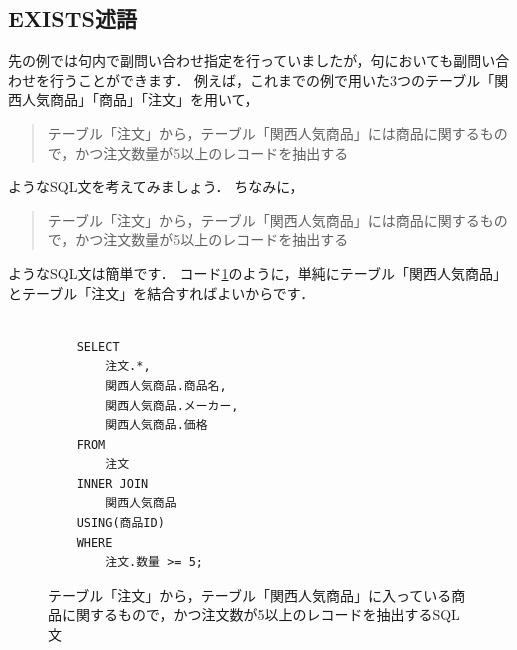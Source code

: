 \subsection{EXISTS述語}
先の例では句内で副問い合わせ指定を行っていましたが，句においても副問い合わせを行うことができます．
例えば，これまでの例で用いた3つのテーブル「関西人気商品」「商品」「注文」を用いて，
\begin{quotation}
テーブル「注文」から，テーブル「関西人気商品」には商品に関するもので，かつ注文数量が5以上のレコードを抽出する
\end{quotation}
ようなSQL文を考えてみましょう．
ちなみに，
\begin{quotation}
テーブル「注文」から，テーブル「関西人気商品」には商品に関するもので，かつ注文数量が5以上のレコードを抽出する
\end{quotation}
ようなSQL文は簡単です．
コード\ref{code:subquery-where-in}のように，単純にテーブル「関西人気商品」とテーブル「注文」を結合すればよいからです．
\begin{figure}[!htbp]
    \begin{verbatim}

    SELECT
        注文.*,
        関西人気商品.商品名,
        関西人気商品.メーカー,
        関西人気商品.価格
    FROM
        注文
    INNER JOIN
        関西人気商品
    USING(商品ID)
    WHERE
        注文.数量 >= 5;

    \end{verbatim}
    \captionsetup{name=コード}
    \caption{テーブル「注文」から，テーブル「関西人気商品」に入っている商品に関するもので，かつ注文数が5以上のレコードを抽出するSQL文}
    \label{code:subquery-where-in}
\end{figure}


